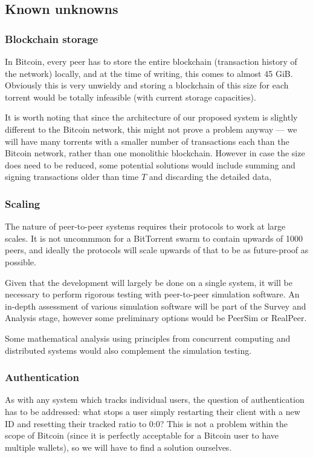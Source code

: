 \documentclass{article}
\begin{document}
\subsection{Known unknowns}

\subsubsection{Blockchain storage}
In Bitcoin, every peer has to store the entire blockchain (transaction history of the network) locally, and at the time of writing, this comes to almost 45 GiB.  Obviously this is very unwieldy and storing a blockchain of this size for each torrent would be totally infeasible (with current storage capacities).

It is worth noting that since the architecture of our proposed system is slightly different to the Bitcoin network, this might not prove a problem anyway --- we will have many torrents with a smaller number of transactions each than the Bitcoin network, rather than one monolithic blockchain.  However in case the size does need to be reduced, some potential solutions would include summing and signing transactions older than time $T$ and discarding the detailed data,


\subsubsection{Scaling}
The nature of peer-to-peer systems requires their protocols to work at large scales.  It is not uncommmon for a BitTorrent swarm to contain upwards of 1000 peers, and ideally the protocols will scale upwards of that to be as future-proof as possible.

Given that the development will largely be done on a single system, it will be necessary to perform rigorous testing with peer-to-peer simulation software.  An in-depth assessment of various simulation software will be part of the Survey and Analysis stage, however some preliminary options would be PeerSim or RealPeer.

Some mathematical analysis using principles from concurrent computing and distributed systems would also complement the simulation testing.

\subsubsection{Authentication}
As with any system which tracks individual users, the question of authentication has to be addressed: what stops a user simply restarting their client with a new ID and resetting their tracked ratio to 0:0?  This is not a problem within the scope of Bitcoin (since it is perfectly acceptable for a Bitcoin user to have multiple wallets), so we will have to find a solution ourselves.
\end{document}
